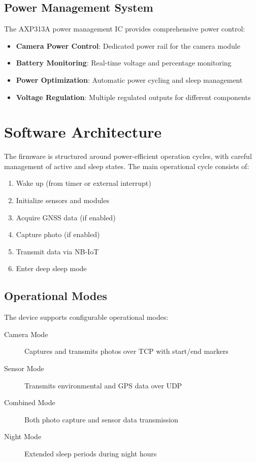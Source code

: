 \documentclass[11pt,a4paper]{article}
\begin{document}
\subsection{Power Management System}

The AXP313A power management IC provides comprehensive power control:

\begin{itemize}
    \item \textbf{Camera Power Control}: Dedicated power rail for the camera module
    \item \textbf{Battery Monitoring}: Real-time voltage and percentage monitoring
    \item \textbf{Power Optimization}: Automatic power cycling and sleep management
    \item \textbf{Voltage Regulation}: Multiple regulated outputs for different components
\end{itemize}

\section{Software Architecture}

The firmware is structured around power-efficient operation cycles, with careful management of active and sleep states. The main operational cycle consists of:

\begin{enumerate}
    \item Wake up (from timer or external interrupt)
    \item Initialize sensors and modules
    \item Acquire GNSS data (if enabled)
    \item Capture photo (if enabled)
    \item Transmit data via NB-IoT
    \item Enter deep sleep mode
\end{enumerate}

\subsection{Operational Modes}

The device supports configurable operational modes:

\begin{description}
    \item[Camera Mode] Captures and transmits photos over TCP with start/end markers
    \item[Sensor Mode] Transmits environmental and GPS data over UDP
    \item[Combined Mode] Both photo capture and sensor data transmission
    \item[Night Mode] Extended sleep periods during night hours
\end{description}
\end{document}
